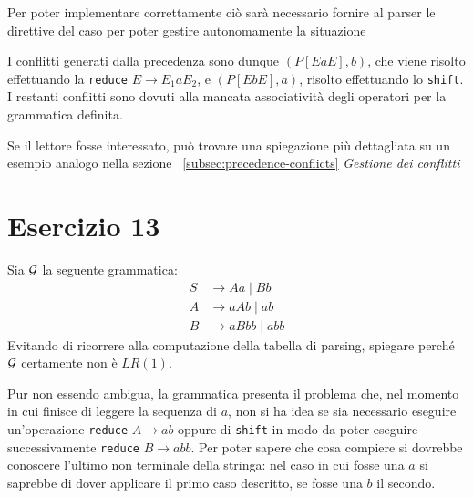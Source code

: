 \documentclass[class=book, crop=false, oneside, 12pt]{standalone}
\begin{document}
Per poter implementare correttamente ciò sarà necessario fornire al parser le direttive del caso per poter gestire autonomamente la situazione

I conflitti generati dalla precedenza sono dunque \((P[EaE],b)\), che viene risolto effettuando la \texttt{reduce} \(E \to E_1 a E_2\), e \((P[EbE],a)\), risolto effettuando lo \texttt{shift}. I restanti conflitti sono dovuti alla mancata associatività degli operatori per la grammatica definita. 

Se il lettore fosse interessato, può trovare una spiegazione più dettagliata su un esempio analogo nella sezione ~\ref{subsec:precedence-conflicts} \emph{Gestione dei conflitti}

\section*{Esercizio 13}


Sia \(\mathcal{G}\) la seguente grammatica:
\begin{align*}
    S &\to Aa \mid Bb \\
    A &\to aAb \mid ab \\
    B &\to aBbb \mid abb
\end{align*}
Evitando  di  ricorrere  alla  computazione  della  tabella  di  parsing,  spiegare  perché \(\mathcal{G}\) certamente  non è \(LR(1)\).

Pur non essendo ambigua, la grammatica presenta il problema che, nel momento in cui finisce di leggere la sequenza di \(a\), non si ha idea se sia necessario eseguire un'operazione \texttt{reduce} \(A \to ab\) oppure di \texttt{shift} in modo da poter eseguire successivamente \texttt{reduce} \(B \to abb\). Per poter sapere che cosa compiere si dovrebbe conoscere l'ultimo non terminale della stringa: nel caso in cui fosse una \(a\) si saprebbe di dover applicare il primo caso descritto, se fosse una \(b\) il secondo.
\end{document}
